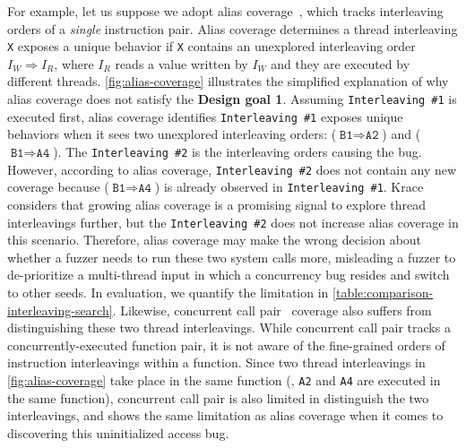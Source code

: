 For example, let us suppose we adopt alias coverage~\cite{krace},
which tracks interleaving orders of a \textit{single} instruction
pair.
%
Alias coverage determines a thread interleaving \texttt{X} exposes a
unique behavior if \texttt{X} contains an unexplored interleaving
order $I_W \Rightarrow I_R$, where $I_R$ reads a value written by
$I_W$ and they are executed by different threads.
\autoref{fig:alias-coverage} illustrates the simplified
explanation of why alias coverage does not satisfy the \textbf{Design
  goal 1}.
%
Assuming \texttt{Interleaving \#1} is executed first, alias coverage
identifies \texttt{Interleaving \#1} exposes unique behaviors when it
sees two unexplored interleaving orders:
($\texttt{B1} \Rightarrow \texttt{A2}$) and
($\texttt{B1} \Rightarrow \texttt{A4}$).
%
The \texttt{Interleaving \#2} is the interleaving orders causing the bug.
However, according to alias coverage, \texttt{Interleaving \#2}
does not contain any new coverage because ($\texttt{B1} \Rightarrow \texttt{A4}$) is already observed in \texttt{Interleaving \#1}.
Krace considers that growing alias coverage is a promising signal 
to explore thread interleavings further, but the \texttt{Interleaving \#2} does not increase alias coverage in this scenario.
%
Therefore, alias coverage may make the wrong decision about whether a
fuzzer needs to run these two system calls more, misleading a fuzzer
to de-prioritize a multi-thread input in which a concurrency bug
resides and switch to other seeds. In evaluation, we quantify the
limitation in \autoref{table:comparison-interleaving-search}.
Likewise, concurrent call pair~\cite{conzzer} coverage also suffers from
distinguishing these two thread interleavings.
%
While concurrent call pair tracks a concurrently-executed function
pair, it is not aware of the fine-grained orders of instruction interleavings within a function.
%
Since two thread interleavings in \autoref{fig:alias-coverage} take
place in the same function (\ie, \texttt{A2} and \texttt{A4} are
executed in the same function), concurrent call pair is also limited
in distinguish the two interleavings, and shows the same limitation as
alias coverage when it comes to discovering this uninitialized access
bug.

